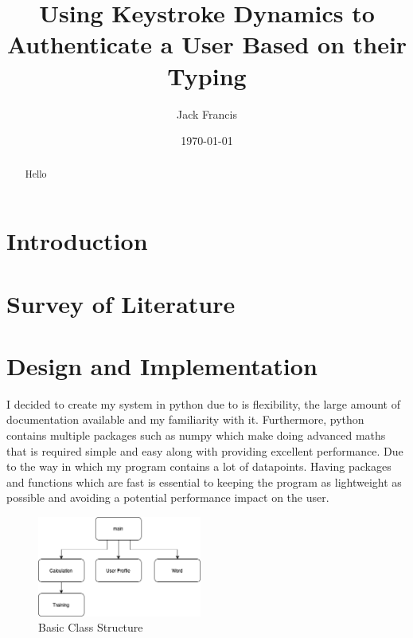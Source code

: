 \documentclass[10pt,a4paper]{report}
\title{Using Keystroke Dynamics to Authenticate a User Based on their Typing}
\author{Jack Francis}
\date{\today}
\begin{document}
\maketitle

\begin{abstract}
Hello
\end{abstract}

\tableofcontents


\chapter{Introduction}
\setcounter{page}{1}

\chapter{Survey of Literature}

\chapter{Design and Implementation}

I decided to create my system in python due to is flexibility, the large amount of documentation available and my familiarity with it. Furthermore, python contains multiple packages such as numpy which make doing advanced maths that is required simple and easy along with providing excellent performance. Due to the way in which my program contains a lot of datapoints. Having packages and functions which are fast is essential to keeping the program as lightweight as possible and avoiding a potential performance impact on the user.

\begin{figure}
	\begin{center}
		\includegraphics[width=0.48\textwidth]{OOP}
	\end{center}
	\caption{Basic Class Structure}
	\label{fig:ClassStruct}
\end{figure}
\end{document}
